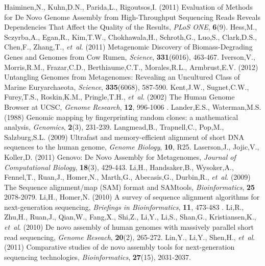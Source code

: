 \documentclass[phd,tocprelim]{cornell}
\begin{document}
\begin{thebibliography}{}
 Haiminen,N., Kuhn,D.N., Parida,L., Rigoutsos,I. (2011) Evaluation of Methods for De Novo Genome Assembly from High-Throughput Sequencing Reads Reveals Dependencies That Affect the Quality of the Results, {\it PLoS ONE}, {\bf 6}(9).
 Hess,M., Sczyrba,A., Egan,R., Kim,T.W., Chokhawala,H., Schroth,G., Luo,S., Clark,D.S., Chen,F., Zhang,T., {\it et~al}. (2011) Metagenomic Discovery of Biomass-Degrading Genes and Genomes from Cow Rumen, {\it Science}, {\bf 331}(6016), 463-467.
 Iverson,V., Morris,R.M., Frazar,C.D., Berthiaume,C.T., Morales,R.L., Armbrust,E.V. (2012) Untangling Genomes from Metagenomes: Revealing an Uncultured Class of Marine Euryarchaeota, {\it Science}, {\bf 335}(6068), 587-590.
 Kent,J.W., Sugnet,C.W., Furey,T.S., Roskin,K.M., Pringle,T.H., {\it et~al}. (2002) The Human Genome Browser at UCSC, {\it Genome Research}, {\bf 12}, 996-1006
.
 Lander,E.S., Waterman,M.S. (1988) Genomic mapping by fingerprinting random clones: a mathematical analysis, {\it Genomics}, {\bf 2}(3), 231-239.
 Langmead,B., Trapnell,C., Pop,M., Salzburg,S.L. (2009) Ultrafast and memory-efficient alignment of short DNA sequences to the human genome, {\it Genome Biology}, {\bf 10}, R25.
 Laserson,J., Jojic,V., Koller,D. (2011) Genovo: De Novo Assembly for Metagenomes, {\it Journal of Computational Biology}, {\bf 18}(3), 429-443.
 Li,H., Handsaker,B., Wysoker,A., Fennel,T., Ruan,J., Homer,N., Marth,G., Abecasis,G., Durbin,R., {\it et~al}. (2009) The Sequence alignment/map (SAM) format and SAMtools, {\it Bioinformatics}, {\bf 25} 2078-2079.
 Li,H., Homer,N. (2010) A survey of sequence alignment algorithms for next-generation sequencing, {\it Briefings in Bioinformatics}, {\bf 11}, 473-483
.
 Li,R., Zhu,H., Ruan,J., Qian,W., Fang,X., Shi,Z., Li,Y., Li,S., Shan,G., Kristiansen,K., {\it et~al}. (2010) De novo assembly of human genomes with massively parallel short read sequencing, {\it Genome Reseach}, {\bf 20}(2), 265-272.
 Lin,Y., Li,Y., Shen,H., {\it et~al}. (2011) Comparative studies of de novo assembly tools for next-generation sequencing technologies, {\it Bioinformatics}, {\bf 27}(15), 2031-2037.

\end{thebibliography}
\end{document}
